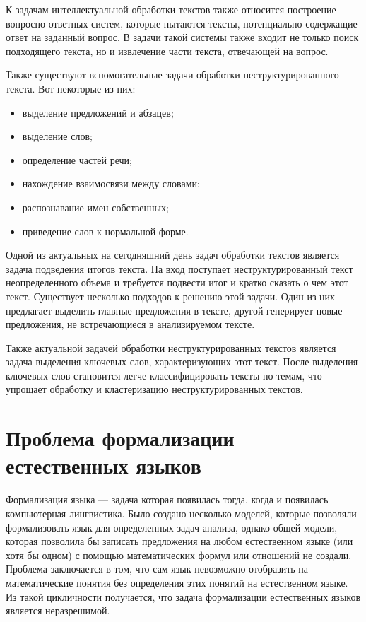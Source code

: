 К задачам интеллектуальной обработки текстов также относится построение вопросно-ответных систем, которые пытаются тексты, потенциально содержащие ответ на заданный вопрос. В задачи такой системы также входит не только поиск подходящего текста, но и извлечение части текста, отвечающей на вопрос.

Также существуют вспомогательные задачи обработки неструктурированного текста. Вот некоторые из них:
\begin{itemize}
    \item выделение предложений и абзацев;
    \item выделение слов;
    \item определение частей речи;
    \item нахождение взаимосвязи между словами;
    \item распознавание имен собственных;
    \item приведение слов к нормальной форме.
\end{itemize}

Одной из актуальных на сегодняшний день задач обработки текстов является задача подведения итогов текста. На вход поступает неструктурированный текст неопределенного объема и требуется подвести итог и кратко сказать о чем этот текст. Существует несколько подходов к решению этой задачи. Один из них предлагает выделить главные предложения в тексте, другой генерирует новые предложения, не встречающиеся в анализируемом тексте.

Также актуальной задачей обработки неструктурированных текстов является задача выделения ключевых слов, характеризующих этот текст. После выделения ключевых слов становится легче классифицировать тексты по темам, что упрощает обработку и кластеризацию неструктурированных текстов.

\section{Проблема формализации естественных языков}

Формализация языка --- задача которая появилась тогда, когда и появилась компьютерная лингвистика. Было создано несколько моделей, которые позволяли формализовать язык для определенных задач анализа, однако общей модели, которая позволила бы записать предложения на любом естественном языке (или хотя бы одном) с помощью математических формул или отношений не создали. Проблема заключается в том, что сам язык невозможно отобразить на математические понятия без определения этих понятий на естественном языке. Из такой цикличности получается, что задача формализации естественных языков является неразрешимой.


